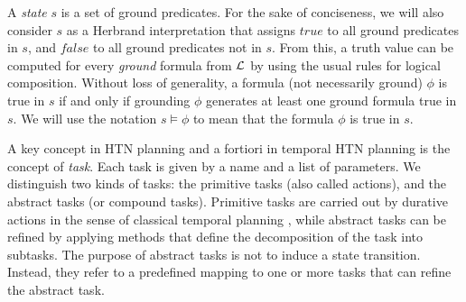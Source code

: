 \documentclass[letterpaper]{article} %
\begin{document}
A {\it state} $s$ is a set of ground predicates. For the sake of conciseness, we will also consider $s$ as a Herbrand interpretation that assigns $true$ to all ground predicates in $s$, and $false$ to all ground predicates not in $s$. From this, a truth value can be computed for every {\it ground} formula from ${\cal{L}}$ by using the usual rules for logical composition.
Without loss of generality, a formula (not necessarily ground) $\phi$ is true in $s$ if and only if grounding $\phi$ generates at least one ground formula true in $s$. We will use the notation $s \models \phi$ to mean that the formula $\phi$ is true in $s$.



 A key concept in HTN planning and a fortiori in temporal HTN planning is the concept of {\it task}. Each task is given by a name and a list of parameters. We distinguish two kinds of tasks: the  primitive tasks (also called actions), and the abstract tasks (or compound tasks).
 Primitive tasks are carried out by  durative actions in the sense of classical temporal planning \cite{fox03}, while abstract tasks can be refined by applying methods that define the decomposition of the task into subtasks. The purpose of abstract tasks is not to induce a state transition. Instead, they refer to a predefined mapping to one or more tasks that can refine the abstract task.
 
\end{document}
